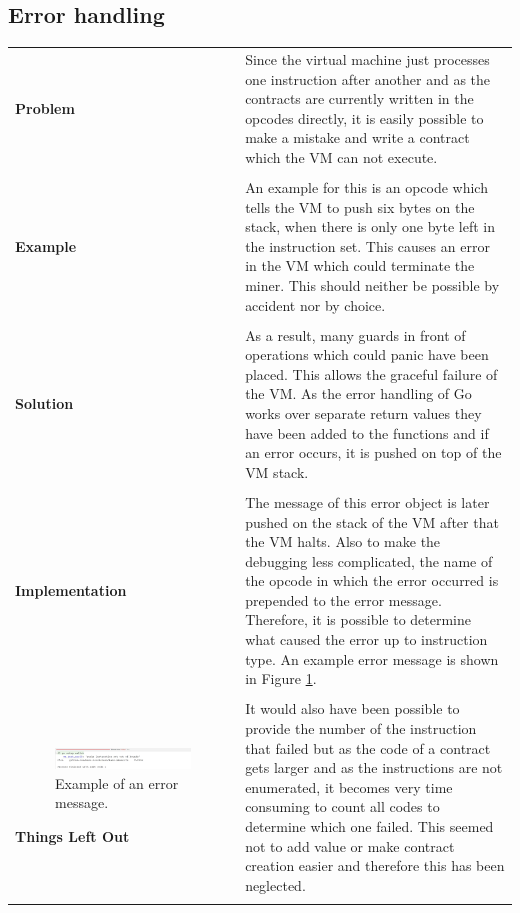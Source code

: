 \subsection{Error handling}
\begin{tabular}[t]{ p{3cm} p{12.5cm}}
\raggedright
\textbf{Problem} &
Since the virtual machine just processes one instruction after another and as the contracts are currently written in the opcodes directly, it is easily possible to make a mistake and write a contract which the VM can not execute. \\ \\

\raggedright
\textbf{Example} &
An example for this is an opcode which tells the VM to push six bytes on the stack, when there is only one byte left in the instruction set. This causes an error in the VM which could terminate the miner. This should neither be possible by accident nor by choice. \\ \\

\raggedright
\textbf{Solution} &
As a result, many guards in front of operations which could panic have been placed. This allows the graceful failure of the VM. As the error handling of Go works over separate return values they have been added to the functions and if an error occurs, it is pushed on top of the VM stack. \\ \\

\raggedright
\textbf{Implementation} &
The message of this error object is later pushed on the stack of the VM after that the VM halts. Also to make the debugging less complicated, the name of the opcode in which the error occurred is prepended to the error message. Therefore, it is possible to determine what caused the error up to instruction type. An example error message is shown in Figure \ref{pushtestfailure}. \\ \\

\begin{figure}[H]
	\begin{center}
	\includegraphics[width=\textwidth]{./images/push-test-failure}
	\caption{Example of an error message.}
	\label{pushtestfailure}
	\end{center}
\end{figure}

\raggedright
\textbf{Things Left Out} &
It would also have been possible to provide the number of the instruction that failed but as the code of a contract gets larger and as the instructions are not enumerated, it becomes very time consuming to count all codes to determine which one failed. This seemed not to add value or make contract creation easier and therefore this has been neglected. \\ \\
\end{tabular}

